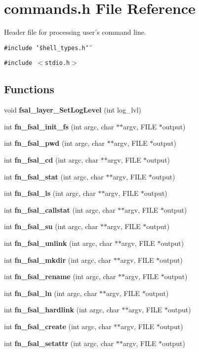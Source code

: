 \section{commands.h File Reference}
\label{commands_8h}
Header file for processing user's command line.  


{\tt \#include \char`\"{}shell\_\-types.h\char`\"{}}\par
{\tt \#include $<$stdio.h$>$}\par
\subsection*{Functions}
\begin{CompactItemize}
\item 
void {\bf fsal\_\-layer\_\-SetLogLevel} (int log\_\-lvl)
\item 
int {\bf fn\_\-fsal\_\-init\_\-fs} (int argc, char $\ast$$\ast$argv, FILE $\ast$output)
\item 
int {\bf fn\_\-fsal\_\-pwd} (int argc, char $\ast$$\ast$argv, FILE $\ast$output)
\item 
int {\bf fn\_\-fsal\_\-cd} (int argc, char $\ast$$\ast$argv, FILE $\ast$output)
\item 
int {\bf fn\_\-fsal\_\-stat} (int argc, char $\ast$$\ast$argv, FILE $\ast$output)
\item 
int {\bf fn\_\-fsal\_\-ls} (int argc, char $\ast$$\ast$argv, FILE $\ast$output)
\item 
int {\bf fn\_\-fsal\_\-callstat} (int argc, char $\ast$$\ast$argv, FILE $\ast$output)
\item 
int {\bf fn\_\-fsal\_\-su} (int argc, char $\ast$$\ast$argv, FILE $\ast$output)
\item 
int {\bf fn\_\-fsal\_\-unlink} (int argc, char $\ast$$\ast$argv, FILE $\ast$output)
\item 
int {\bf fn\_\-fsal\_\-mkdir} (int argc, char $\ast$$\ast$argv, FILE $\ast$output)
\item 
int {\bf fn\_\-fsal\_\-rename} (int argc, char $\ast$$\ast$argv, FILE $\ast$output)
\item 
int {\bf fn\_\-fsal\_\-ln} (int argc, char $\ast$$\ast$argv, FILE $\ast$output)
\item 
int {\bf fn\_\-fsal\_\-hardlink} (int argc, char $\ast$$\ast$argv, FILE $\ast$output)
\item 
int {\bf fn\_\-fsal\_\-create} (int argc, char $\ast$$\ast$argv, FILE $\ast$output)
\item 
int {\bf fn\_\-fsal\_\-setattr} (int argc, char $\ast$$\ast$argv, FILE $\ast$output)

\end{CompactItemize}
